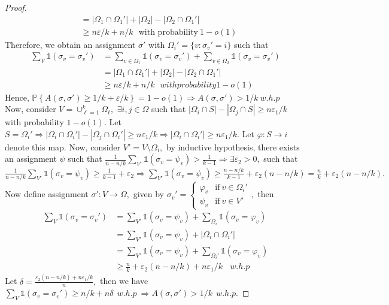 \begin{proof}
\begin{align*}
    &=|\Omega_1\cap\Omega_1'|+|\Omega_2|-|\Omega_2\cap\Omega_1'|\\
    &\geq n\varepsilon/k+n/k~~~\text{with probability}~1-o(1)
    \end{align*}
    Therefore, we obtain an assignment $\sigma'$ with $\Omega_i'=\{v: \sigma_v'=i\}$ such that
    \begin{align*}
        \sum_V\mathbb{1}(\sigma_v=\sigma_v')&=\sum_{v\in\Omega_1}\mathbb{1}(\sigma_v=\sigma_v')+\sum_{v\in\Omega_2}\mathbb{1}(\sigma_v=\sigma_v')\\
        &=|\Omega_1\cap\Omega_1'|+|\Omega_2|-|\Omega_2\cap\Omega_1'|\\
        &\geq n\varepsilon/k+n/k~~~with probability 1-o(1)
    \end{align*} Hence, $\mathbb{P}\left\{A(\sigma, \sigma')\geq1/k+\varepsilon/k\right\}=1-o(1)\Rightarrow A(\sigma, \sigma')>1/k~w.h.p$\\
    Now, consider $V=\cup_{\ell=1}^k\Omega_\ell,$ $\exists i, j\in\Omega$ such that $|\Omega_i\cap S|-|\Omega_j\cap S|\geq n\varepsilon_1/k$ with probability $1-o(1).$ Let $S=\Omega_i'\Rightarrow|\Omega_i\cap\Omega_i'|-|\Omega_j\cap\Omega_i'|\geq n\varepsilon_1/k\Rightarrow |\Omega_i\cap\Omega_i'|\geq n\varepsilon_1/k.$ Let $\varphi: S\rightarrow i$ denote this map. Now, consider $V'=V\setminus\Omega_i,$ by inductive hypothesis, there exists an assignment $\psi$ such that $\frac{1}{n-n/k}\sum_{V'}\mathbb{1}(\sigma_v=\psi_v)>\frac{1}{k-1}\Rightarrow\exists\varepsilon_2>0,$ such that $\frac{1}{n-n/k}\sum_{V'}\mathbb{1}(\sigma_v=\psi_v)\geq\frac{1}{k-1}+\varepsilon_2\Rightarrow\sum_{V'}\mathbb{1}(\sigma_v=\psi_v)\geq\frac{n-n/k}{k-1}+\varepsilon_2(n-n/k)=\frac{n}{k}+\varepsilon_2(n-n/k).$ Now define assignment $\sigma': V\rightarrow\Omega,$ given by $\sigma_v'=\begin{cases}
        \varphi_v & \text{if}~v\in\Omega_i'\\
        \psi_v & \text{if}~v\in V'
    \end{cases},$ then \begin{align*}
        \sum_V\mathbb{1}(\sigma_v=\sigma_v')&=\sum_{V'}\mathbb{1}(\sigma_v=\psi_v)+\sum_{\Omega_i}\mathbb{1}(\sigma_v=\varphi_v)\\
        &=\sum_{V'}\mathbb{1}(\sigma_v=\psi_v)+|\Omega_i\cap\Omega_i'|\\
        &=\sum_{V'}\mathbb{1}(\sigma_v=\psi_v)+\sum_{\Omega_i'}\mathbb{1}(\sigma_v=\varphi_v)\\
        &\geq\frac{n}{k}+\varepsilon_2(n-n/k)+n\varepsilon_1/k~~~~w.h.p
    \end{align*}
    Let $\delta=\frac{\varepsilon_2(n-n/k)+n\varepsilon_1/k}{n},$ then we have $\sum_V\mathbb{1}(\sigma_v=\sigma_v')\geq n/k+n\delta~~w.h.p~\Rightarrow A(\sigma, \sigma')>1/k~~w.h.p.$
\end{proof}
